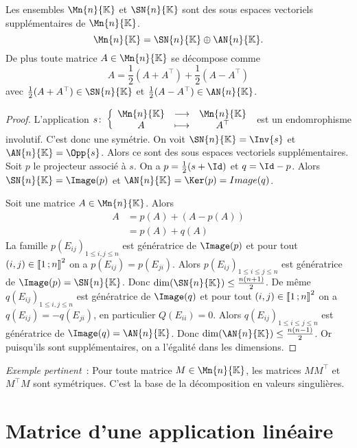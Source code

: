 \begin{theo}
  Les ensembles $\Mn{n}{\K}$ et $\SN{n}{\K}$ sont des sous espaces vectoriels supplémentaires de $\Mn{n}{\K}$.
  \begin{equation}
    \Mn{n}{\K}=\SN{n}{\K} \oplus \AN{n}{\K}.
  \end{equation}
  De plus toute matrice $A \in \Mn{n}{\K}$ se décompose comme
  \begin{equation}
    A = \frac{1}{2} (A+A^\top) + \frac{1}{2} (A-A^\top)
  \end{equation}
  avec $\frac{1}{2} (A+A^\top) \in \SN{n}{\K}$ et $\frac{1}{2} (A-A^\top) \in \AN{n}{\K}$.
\end{theo}
\begin{proof}
  L'application $\fonction{s}{\Mn{n}{\K}}{\Mn{n}{\K}}{A}{A^\top}$ est un endomrophisme involutif. C'est donc une symétrie. On voit $\SN{n}{\K}=\Inv{s}$ et $\AN{n}{\K}=\Opp{s}$. Alors ce sont des sous espaces vectoriels supplémentaires. Soit $p$ le projecteur associé à $s$. On a $p=\frac{1}{2}(s+\Id)$ et $q=\Id-p$. Alors $\SN{n}{\K}=\Image(p)$ et $\AN{n}{\K}=\Ker(p)=Image(q)$.

  Soit une matrice $A \in \Mn{n}{\K}$. Alors
  \begin{align}
    A&= p(A)+ (A-p(A))\\
    &= p(A)+q(A)
  \end{align}
  La famille $p(E_{ij})_{1\leq i,j \leq n}$ est génératrice de $\Image(p)$ et pour tout $(i,j) \in \mathopen{\llbracket}1\mathclose{}\mathpunct{};n\mathclose{\rrbracket}^2$ on a $p(E_{ij})=p(E_{ji})$. Alors $p(E_{ij})_{1\leq i \leq j \leq n}$ est génératrice de $\Image(p)=\SN{n}{\K}$. Donc $\dim(\SN{n}{\K}) \leq \frac{n(n+1)}{2}$. De même $q(E_{ij})_{1\leq i,j \leq n}$ est génératrice de $\Image(q)$ et pour tout $(i,j) \in \mathopen{\llbracket}1\mathclose{}\mathpunct{};n\mathclose{\rrbracket}^2$ on a $q(E_{ij})=-q(E_{ji})$, en particulier $Q(E_{ii})=0$. Alors $q(E_{ij})_{1\leq i \leq j \leq n}$ est génératrice de $\Image(q)=\AN{n}{\K}$. Donc $\dim(\AN{n}{\K}) \leq \frac{n(n-1)}{2}$. Or puisqu'ils sont supplémentaires, on a l'égalité dans les dimensions.
\end{proof}

\emph{Exemple pertinent}~: Pour toute matrice $M \in \Mn{n}{\K}$, les matrices $MM^\top$ et $M^\top M$ sont symétriques. C'est la base de la décomposition en valeurs singulières.

\section{Matrice d'une application linéaire}

